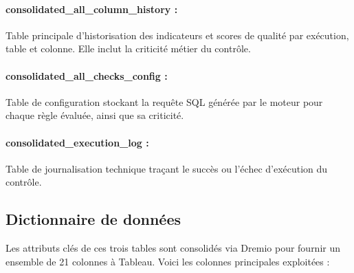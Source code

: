 \paragraph{consolidated\_all\_column\_history :} Table principale d'historisation des indicateurs et scores de qualité par exécution, table et colonne. Elle inclut la criticité métier du contrôle.

\paragraph{consolidated\_all\_checks\_config :} Table de configuration stockant la requête SQL générée par le moteur pour chaque règle évaluée, ainsi que sa criticité.

\paragraph{consolidated\_execution\_log :} Table de journalisation technique traçant le succès ou l'échec d'exécution du contrôle.



\subsection{Dictionnaire de données}
Les attributs clés de ces trois tables sont consolidés via Dremio pour fournir un ensemble de 21 colonnes à Tableau. Voici les colonnes principales exploitées :

